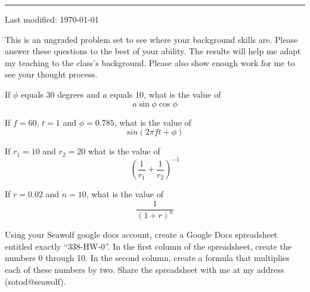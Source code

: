 \documentclass{article}
\begin{document}
\hrule
\vspace{10pt}

{\tiny Last modified: \today}

This is an ungraded problem set to see where your background skills are.
Please answer these questions to the best of your ability.  The results
will help me adapt my teaching to the class's background.  Please also
show enough work for me to see your thought process.


\problem{}

If $\phi$ equals 30 degrees and $a$ equals 10, what is the value of
$$ a\sin\phi\cos\phi $$


\problem{}

If $f = 60$, $t= 1$ and $\phi = 0.785$, what is the value of
$$ sin(2\pi f t + \phi) $$


\problem{}

If $r_1 = 10$ and $r_2 = 20$ what is the value of
$$ \left(\frac{1}{r_1} + \frac{1}{r_2}\right)^{-1} $$


\problem{}

If $r = 0.02$ and $n = 10$, what is the value of
$$ \frac{1}{(1 + r)^n} $$





Using your Seawolf google docs account, create a Google Docs
spreadsheet entitled exactly ``338-HW-0''.  In the first
column of the spreadsheet, create the numbers 0 through 10.  In the
second column, create a formula that multiplies each of these numbers by
two.  Share the spreadsheet with me at my address (sotod@seawolf).

\end{document}
